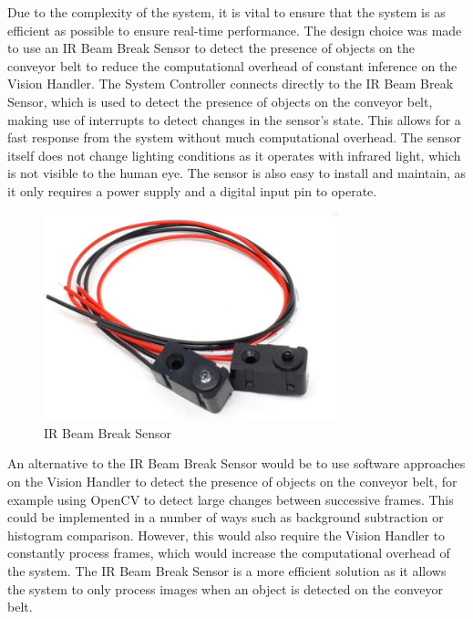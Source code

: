 Due to the complexity of the system, it is vital to ensure that the system is as efficient as possible to ensure real-time performance. The design choice was made to use an IR Beam Break Sensor \cite{breakbeamsensor} to detect the presence of objects on the conveyor belt to reduce the computational overhead of constant inference on the Vision Handler. The System Controller connects directly to the IR Beam Break Sensor, which is used to detect the presence of objects on the conveyor belt, making use of interrupts to detect changes in the sensor's state. This allows for a fast response from the system without much computational overhead. The sensor itself does not change lighting conditions as it operates with infrared light, which is not visible to the human eye. The sensor is also easy to install and maintain, as it only requires a power supply and a digital input pin to operate.

\begin{figure}[H]
    \begin{minipage}[h]{0.95\textwidth}
        \centering
        \includegraphics[height=6cm]{imgs/parts/breakbeam.jpg}
        \caption{IR Beam Break Sensor \cite{breakbeamsensor}}
    \end{minipage}
\end{figure}

An alternative to the IR Beam Break Sensor would be to use software approaches on the Vision Handler to detect the presence of objects on the conveyor belt, for example using OpenCV to detect large changes between successive frames. This could be implemented in a number of ways such as background subtraction or histogram comparison. However, this would also require the Vision Handler to constantly process frames, which would increase the computational overhead of the system. The IR Beam Break Sensor is a more efficient solution as it allows the system to only process images when an object is detected on the conveyor belt.

